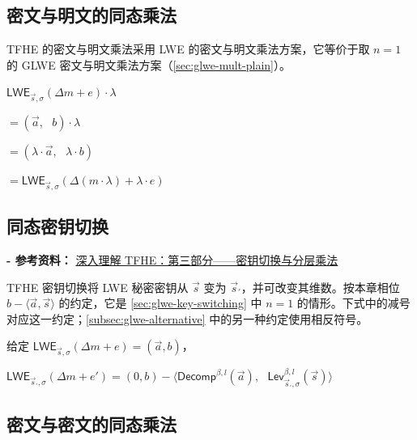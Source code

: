 \subsection{密文与明文的同态乘法}
\label{subsec:tfhe-mult-plain}

TFHE 的密文与明文乘法采用 LWE 的密文与明文乘法方案，它等价于取 $n = 1$ 的 GLWE 密文与明文乘法方案（\autoref{sec:glwe-mult-plain}）。

\begin{tcolorbox}[title={\textbf{\tboxlabel{\ref*{subsec:tfhe-mult-plain}} TFHE 密文与明文乘法}}]
$\textsf{LWE}_{\vec{s}, \sigma}(\Delta m + e) \cdot \lambda$

$= (\vec{a}, \text{ } b) \cdot \lambda$

$= (\lambda\cdot \vec{a}, \text{ } \lambda \cdot b)$

$= \textsf{LWE}_{\vec{s}, \sigma}(\Delta (m \cdot \lambda) + \lambda \cdot e )$
\end{tcolorbox}


\subsection{同态密钥切换}
\label{subsec:tfhe-key-switching}

\textbf{- 参考资料：}
\href{https://www.zama.ai/post/tfhe-deep-dive-part-3}{深入理解 TFHE：第三部分——密钥切换与分层乘法}~\cite{tfhe-3}

TFHE 密钥切换将 LWE 秘密密钥从 $\vec{s}$ 变为 $\vec{s}_{'}$，并可改变其维数。按本章相位 $b-\langle\vec a,\vec s\rangle$ 的约定，它是 \autoref{sec:glwe-key-switching} 中 $n=1$ 的情形。下式中的减号对应这一约定；\autoref{subsec:glwe-alternative} 中的另一种约定使用相反符号。

\begin{tcolorbox}[title={\textbf{\tboxlabel{\ref*{subsec:tfhe-key-switching}} TFHE 密钥切换}}]

给定 $\textsf{LWE}_{\vec{s},\sigma}(\Delta m + e) = (\vec{a}, b)$，

$\textsf{LWE}_{\vec{s}_{'},\sigma}(\Delta m + e') = (0, b) - \bm{\langle} \textsf{Decomp}^{\beta, l}(\vec{a}), \text{ } \textsf{Lev}_{\vec{s}_{'}, \sigma}^{\beta, l}(\vec{s}) \bm{\rangle}$
\end{tcolorbox}


\subsection{密文与密文的同态乘法}
\label{subsec:tfhe-mult-cipher}

